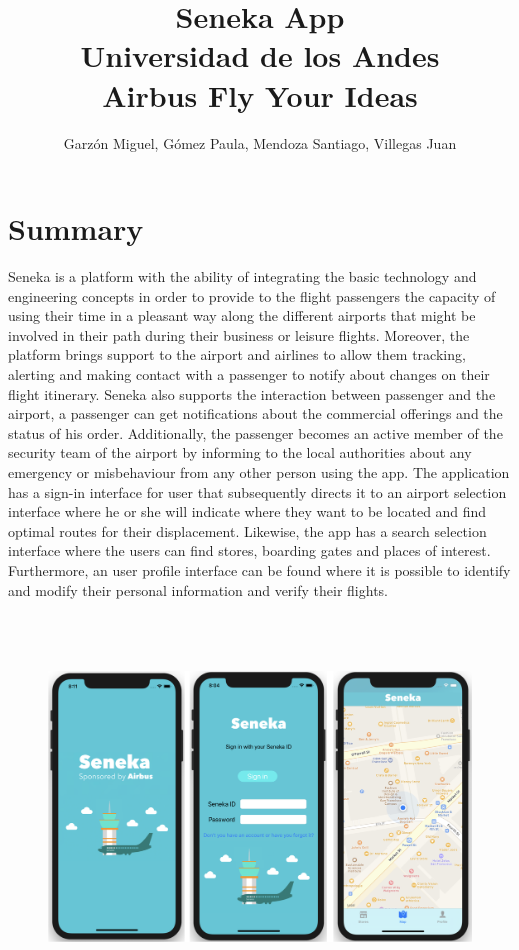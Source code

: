 \documentclass[]{article}
\begin{document}
\title{Seneka App\\
Universidad de los Andes\\
Airbus Fly Your Ideas}
\author{Garzón Miguel, Gómez Paula, Mendoza Santiago, Villegas Juan}
\maketitle


\section{Summary}

Seneka is a platform with the ability of integrating the basic technology and engineering concepts in order to provide to the flight passengers the capacity of using their time in a pleasant way along the different airports that might be involved in their path during their business or leisure flights. Moreover, the platform brings support to the airport and airlines to allow them tracking, alerting and making contact with a passenger to notify about changes on their flight itinerary. Seneka also supports the interaction between passenger and the airport, a passenger can get notifications about the commercial offerings and the status of his order. Additionally, the passenger becomes an active member of the security team of the airport by informing to the local authorities about any emergency or misbehaviour from any other person using the app. The application has a sign-in interface for user that subsequently directs it to an airport selection interface where he or she will indicate where they want to be located and find optimal routes for their displacement. Likewise, the app has a search selection interface where the users can find stores, boarding gates and places of interest. Furthermore, an user profile interface can be found where it is possible to identify and modify their personal information and verify their flights.\\


\begin{figure}[H]
\centering
\includegraphics[height=4.0in]{Figura_1.jpg}
\end{figure}
\end{document}
